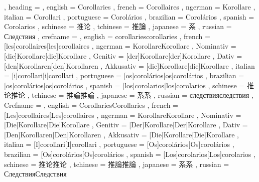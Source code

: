   {
    , heading =   {
                    , english     = Corollaries
                    , french      = Corollaires
                    , ngerman     = Korollare
                    , italian     = Corollari
                    , portuguese  = Corolários
                    , brazilian   = Corolários
                    , spanish     = Corolarios
                    , schinese    = 推论
                    , tchinese    = 推論
                    , japanese    = 系
                    , russian     = Следствия
                  }
    , crefname =  {
                    , english     = {corollaries}{corollaries}
                    , french      = [les]{corollaires}[les]{corollaires}
                    , ngerman     = { {Korollare}{Korollare}
                                      , Nominativ = [die]{Korollare}[die]{Korollare}
                                      , Genitiv   = [der]{Korollare}[der]{Korollare}
                                      , Dativ     = [den]{Korollaren}[den]{Korollaren}
                                      , Akkusativ = [die]{Korollare}[die]{Korollare}
                                    }
                    , italian     = [i]{corollari}[i]{corollari}
                    , portuguese  = [os]{corolários}[os]{corolários}
                    , brazilian   = [os]{corolários}[os]{corolários}
                    , spanish     = [los]{corolarios}[los]{corolarios}
                    , schinese    = {推论}{推论}
                    , tchinese    = {推論}{推論}
                    , japanese    = {系}{系}
                    , russian     = {следствия}{следствия}
                  }
    , Crefname =  {
                    , english     = {Corollaries}{Corollaries}
                    , french      = [Les]{corollaires}[Les]{corollaires}
                    , ngerman     = { {Korollare}{Korollare}
                                      , Nominativ = [Die]{Korollare}[Die]{Korollare}
                                      , Genitiv   = [Der]{Korollare}[Der]{Korollare}
                                      , Dativ     = [Den]{Korollaren}[Den]{Korollaren}
                                      , Akkusativ = [Die]{Korollare}[Die]{Korollare}
                                    }
                    , italian     = [I]{corollari}[I]{corollari}
                    , portuguese  = [Os]{corolários}[Os]{corolários}
                    , brazilian   = [Os]{corolários}[Os]{corolários}
                    , spanish     = [Los]{corolarios}[Los]{corolarios}
                    , schinese    = {推论}{推论}
                    , tchinese    = {推論}{推論}
                    , japanese    = {系}{系}
                    , russian     = {Следствия}{Следствия}
                  }
  }

